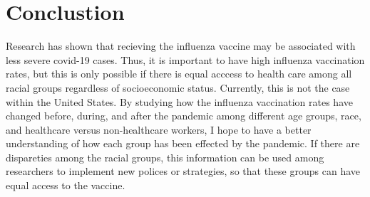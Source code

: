 \documentclass[12pt]{article}
\begin{document}
\section*{Conclustion}
\label{sec:Conclusion}
Research has shown that recieving the influenza vaccine may be associated with less severe covid-19 cases. Thus, it is important to have high influenza vaccination
rates, but this is only possible if there is equal acccess to health care among all racial groups regardless of socioeconomic status. Currently, this is not the case
within the United States. By studying how the influenza vaccination rates have changed before, during, and after the pandemic among different age groups, race, and
healthcare versus non-healthcare workers, I hope to have a better understanding of how each group has been effected by the pandemic. If there are dispareties among the 
racial groups, this information can be used among researchers to implement new polices or strategies, so that these groups can have equal access to the vaccine. 



\end{document}
